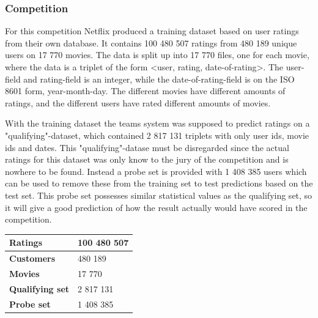 \subsubsection{Competition}

For this competition Netflix produced a training dataset based on user ratings from their own database. It contains 100 480 507 ratings from 480 189 unique users on 17 770 movies. The data is split up into 17 770 files, one for each movie, where the data is a triplet of the form <user, rating, date-of-rating>. The user-field and rating-field is an integer, while the date-of-rating-field is on the ISO 8601 form, year-month-day. The different movies have different amounts of ratings, and the different users have rated different amounts of movies.

With the training dataset the teams system was supposed to predict ratings on a "qualifying"-dataset, which contained 2 817 131 triplets with only user ids, movie ids and dates. This "qualifying"-datase must be disregarded since the actual ratings for this dataset was only know to the jury of the competition and is nowhere to be found. Instead a probe set is provided with 1 408 385 users which can be used to remove these from the training set to test predictions based on the test set. This probe set possesses similar statistical values as the qualifying set, so it will give a good prediction of how the result actually would have scored in the competition\cite{nfprizeset}.

\begin{table}[H]
\centering
\begin{tabular}{ l l }
\hline
\textbf{Ratings} & 100 480 507 \\ \hline
\textbf{Customers} & 480 189 \\ \hline
\textbf{Movies} & 17 770 \\ \hline
\textbf{Qualifying set} & 2 817 131 \\ \hline
\textbf{Probe set} & 1 408 385 \\ \hline
\end{tabular}
\label{tab:nfDatasetStat}
\end{table}

